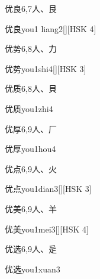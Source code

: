 \begin{entry}{优良}{6,7}{⼈、⾉}
  \begin{phonetics}{优良}{you1 liang2}[][HSK 4]
  \end{phonetics}
\end{entry}

\begin{entry}{优势}{6,8}{⼈、⼒}
  \begin{phonetics}{优势}{you1shi4}[][HSK 3]
  \end{phonetics}
\end{entry}

\begin{entry}{优质}{6,8}{⼈、⾙}
  \begin{phonetics}{优质}{you1zhi4}
  \end{phonetics}
\end{entry}

\begin{entry}{优厚}{6,9}{⼈、⼚}
  \begin{phonetics}{优厚}{you1hou4}
  \end{phonetics}
\end{entry}

\begin{entry}{优点}{6,9}{⼈、⽕}
  \begin{phonetics}{优点}{you1dian3}[][HSK 3]
  \end{phonetics}
\end{entry}

\begin{entry}{优美}{6,9}{⼈、⽺}
  \begin{phonetics}{优美}{you1mei3}[][HSK 4]
  \end{phonetics}
\end{entry}

\begin{entry}{优选}{6,9}{⼈、⾡}
  \begin{phonetics}{优选}{you1xuan3}
  \end{phonetics}
\end{entry}

